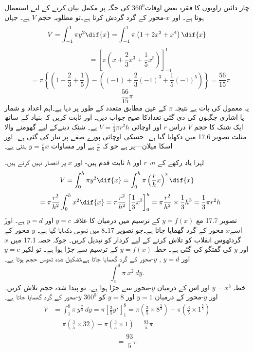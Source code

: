 چار دائیں زاویوں کا فقرہ بعض اوقات\(360^0\) کی جگہ پر مکمل بیان کرنے کے لیے استعمال ہوتا ہے۔ اور \(x\)-محور کے گرد گردش کرتا ہے۔تو مطلوبہ حجم \(V\) ہے۔ جہاں
\[V=\int_{-1}^{1}\pi y^{2}\dif{x}=\int_{-1}^{1}\pi\left(1+2x^{2}+x^4\right)\dif{x}\]
\[\quad=\left[\pi\left(x+\frac{2}{3}x^{3}+\frac{1}{5}x^{5}\right)\right]_{-1}^{1}\]
\[\quad=\pi\left\{\left(1+\frac{2}{3}+\frac{1}{5}\right)-\left((-1)+\frac{2}{3}(-1)^{3}+\frac{1}{5}(-1)^{5}\right)\right\}=\frac{56}{15}\pi\]
\[\frac{56}{15}\pi\]
یہ معمول کی بات ہے نتیجہ \(\pi\) کے عین مطابق متعدد کے طور پر دیا ہے۔اہم اعداد و شمار یا اشاری جگہوں کی دی گئی تعدادکا صیح جواب دیں۔ اور ثابت کریں کہ بنیاد کے ساتھ ایک شنک کا حجم \(V\) دراس \(r\) اور اوچائی \(V=\frac{1}{3}\pi r^{2}h\) یے۔
شنک دینےکے لیے گھومنے والا مثلث تصویر 17.6 میں دکھایا گیا ہے۔ جسکی اوچائی پورے صفے پر تیار کی گئی ہے۔ اور اسکا میلان---پر ہے جو کہ \(\frac{r}{h}\) ہے اور مساوات \(y=\frac{r}{h}x\) بنتی ہے۔

لہزا یاد رکھے کے \(n\)، \(r\) اور \(h\) ثابت قدم ہیں- اور \(x\) پر انعصار نہیں کرتے ہیں۔
\[V=\int_{0}^{h}\pi y^{2}\dif{x}=\int_{0}^{h}\pi\left(\frac{r}{h}x\right)^{2}\dif{x}\]
\[\quad=\pi\frac{r^{2}}{h^{2}}\int_{0}^{h}x^{2}\dif{x}=\pi\frac{r^{2}}{h^{2}}\left[\frac{1}{3}x^{3}\right]_{0}^{h}=\pi\frac{r^{2}}{h^{2}}\times\frac{1}{3}h^{3}=\frac{1}{3}\pi r^{2}h\]
ٓتصویر 17.7 مع \(y=f(x)\) کے ترسیم میں درمیان کا علاقہ \(y=c\) اور \(y=d\) ہے۔ اور اسے\(x\)-محور کے گرد گھمایا جاتا ہے۔جو تصویر 17۔8 میں ٹھوس دکھایا گیا ہے۔ \(y\)-محور کے گردٹھوس انقلاب کو تلاش کرنے کے لیے کردار کو تبدیل کریں۔ جوکہ حصہ 17.1 میں \(x\) اور \(y\) کی گفتگو کی گئی ہے۔
خطہ \(y=f(x)\) کے ترسیم سے جڑا ہوا ہے۔ تو لکیر \(y=c\)  اور \(y=d\) , \(y\)-محور کے گرد گھمایا جاتا ہے،تشکیل شدہ ٹھوس حجم ہوتا ہے۔
\[\int_{c}^{d} \pi \ x^{2} \ dy.\]
خطہ \(y=x^{3}\) اور اس کے درمیان \(y\)-محور سے جڑا ہوا ہے۔ تو پیدا شدہ حجم تلاش کریں۔ اور \(y\)-محور کے درمیان  \(y=1\) اور \(y=8\) کو   \(360^0\)  \(y\)-محور کے گرد گھمایا جاتا ہے۔
\begin{align*}
V&=\int_{1}^{8} \pi \ y^\frac {2}{3} \ dy =\pi [\frac {3}{5} y^\frac {5}{3}]_{1}^{8} =\pi(\frac{3}{5}\times 8^\frac{5}{3}) - \pi(\frac{3}{5}\times 1^\frac{5}{3})\\
&= \pi (\frac {3}{5}\times 32)-\pi(\frac{3}{5}\times 1)=\frac{93}{5}\pi\\
\end{align*}
\[= \frac{93}{5}\pi\]

